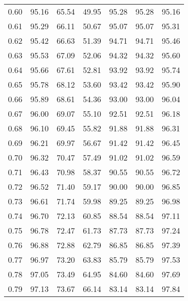 \begin{tabular}{|c|c|c|c|c|c|c|}
      0.60 &     95.16 &     65.54 &      49.95 &   95.28 &      95.28 &         95.16 \\
      0.61 &     95.29 &     66.11 &      50.67 &   95.07 &      95.07 &         95.31 \\
      0.62 &     95.42 &     66.63 &      51.39 &   94.71 &      94.71 &         95.46 \\
      0.63 &     95.53 &     67.09 &      52.06 &   94.32 &      94.32 &         95.60 \\
      0.64 &     95.66 &     67.61 &      52.81 &   93.92 &      93.92 &         95.74 \\
      0.65 &     95.78 &     68.12 &      53.60 &   93.42 &      93.42 &         95.90 \\
      0.66 &     95.89 &     68.61 &      54.36 &   93.00 &      93.00 &         96.04 \\
      0.67 &     96.00 &     69.07 &      55.10 &   92.51 &      92.51 &         96.18 \\
      0.68 &     96.10 &     69.45 &      55.82 &   91.88 &      91.88 &         96.31 \\
      0.69 &     96.21 &     69.97 &      56.67 &   91.42 &      91.42 &         96.45 \\
      0.70 &     96.32 &     70.47 &      57.49 &   91.02 &      91.02 &         96.59 \\
      0.71 &     96.43 &     70.98 &      58.37 &   90.55 &      90.55 &         96.72 \\
      0.72 &     96.52 &     71.40 &      59.17 &   90.00 &      90.00 &         96.85 \\
      0.73 &     96.61 &     71.74 &      59.98 &   89.25 &      89.25 &         96.98 \\
      0.74 &     96.70 &     72.13 &      60.85 &   88.54 &      88.54 &         97.11 \\
      0.75 &     96.78 &     72.47 &      61.73 &   87.73 &      87.73 &         97.24 \\
      0.76 &     96.88 &     72.88 &      62.79 &   86.85 &      86.85 &         97.39 \\
      0.77 &     96.97 &     73.20 &      63.83 &   85.79 &      85.79 &         97.53 \\
      0.78 &     97.05 &     73.49 &      64.95 &   84.60 &      84.60 &         97.69 \\
      0.79 &     97.13 &     73.67 &      66.14 &   83.14 &      83.14 &         97.84 \\

\end{tabular}
